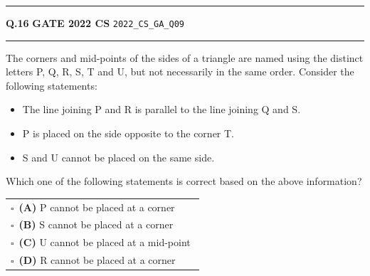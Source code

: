 \documentclass[a4paper,10pt]{article}
\begin{document}
\vspace{6pt}\hrule height 0.35pt\vspace{6pt}
\noindent
\begin{tcolorbox}[
    blanker,
    sidebyside,
    sidebyside align=top,
    lefthand width=0.55\textwidth,
    top=4pt, bottom=4pt, left=0pt, right=0pt,
    middle=16pt,
    underlay={
        \draw[dashed, black!80, line width=0.8pt, dash pattern=on 4pt off 3pt]
            ([xshift=0.55\textwidth+8pt]frame.north west) --
            ([xshift=0.55\textwidth+8pt]frame.south west);
    }
]
\textbf{Q.16}  \hfill {\footnotesize\textbf{GATE 2022 CS} \quad \tiny\texttt{2022\_CS\_GA\_Q09}}
\vspace{2pt}\hrule height 0.3pt\vspace{4pt}

The corners and mid-points of the sides of a triangle are named using the distinct letters P, Q, R, S, T and U, but not necessarily in the same order. Consider the following statements:
\begin{itemize}[itemsep=0pt,topsep=2pt]
\item The line joining P and R is parallel to the line joining Q and S.
\item P is placed on the side opposite to the corner T.
\item S and U cannot be placed on the same side.
\end{itemize}
Which one of the following statements is correct based on the above information?

\par\vspace{6pt}\noindent
\begin{tabular}{@{}p{0.98\linewidth}@{}}
$\square$\ \textbf{(A)} P cannot be placed at a corner \\
\addlinespace[3pt]
$\square$\ \textbf{(B)} S cannot be placed at a corner \\
\addlinespace[3pt]
$\square$\ \textbf{(C)} U cannot be placed at a mid-point \\
\addlinespace[3pt]
$\square$\ \textbf{(D)} R cannot be placed at a corner
\end{tabular}

\tcblower


\end{tcolorbox}
\end{document}
